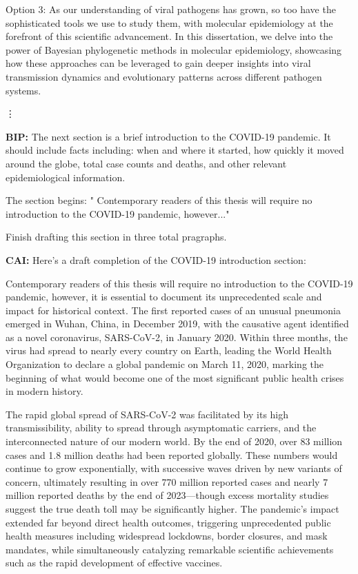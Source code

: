     Option 3:
    As our understanding of viral pathogens has grown, so too have the sophisticated tools we use to study them, with molecular epidemiology at the forefront of this scientific advancement. In this dissertation, we delve into the power of Bayesian phylogenetic methods in molecular epidemiology, showcasing how these approaches can be leveraged to gain deeper insights into viral transmission dynamics and evolutionary patterns across different pathogen systems.

\vdots

\textbf{BIP:} The next section is a brief introduction to the COVID-19 pandemic. It should include facts including: when and where it started, how quickly it moved around the globe, total case counts and deaths, and other relevant epidemiological information.

The section begins: "
Contemporary readers of this thesis will require no introduction to the COVID-19 pandemic, however..."

Finish drafting this section in three total pragraphs.

\textbf{CAI:} Here's a draft completion of the COVID-19 introduction section:

Contemporary readers of this thesis will require no introduction to the COVID-19 pandemic, however, it is essential to document its unprecedented scale and impact for historical context. The first reported cases of an unusual pneumonia emerged in Wuhan, China, in December 2019, with the causative agent identified as a novel coronavirus, SARS-CoV-2, in January 2020. Within three months, the virus had spread to nearly every country on Earth, leading the World Health Organization to declare a global pandemic on March 11, 2020, marking the beginning of what would become one of the most significant public health crises in modern history.

The rapid global spread of SARS-CoV-2 was facilitated by its high transmissibility, ability to spread through asymptomatic carriers, and the interconnected nature of our modern world. By the end of 2020, over 83 million cases and 1.8 million deaths had been reported globally. These numbers would continue to grow exponentially, with successive waves driven by new variants of concern, ultimately resulting in over 770 million reported cases and nearly 7 million reported deaths by the end of 2023—though excess mortality studies suggest the true death toll may be significantly higher. The pandemic's impact extended far beyond direct health outcomes, triggering unprecedented public health measures including widespread lockdowns, border closures, and mask mandates, while simultaneously catalyzing remarkable scientific achievements such as the rapid development of effective vaccines.

